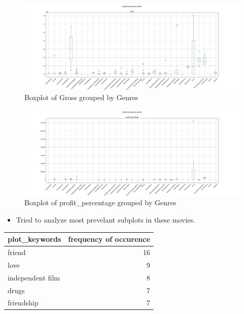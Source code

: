 \documentclass{beamer}
\begin{document}
\begin{frame}
\begin{figure}
	\includegraphics[width=\textwidth,height=\textheight,keepaspectratio]{test100.jpg}
	\caption{Boxplot of Gross grouped by Genres} 
  \label{fig:boat1}
\end{figure}

\end{frame}
\begin{frame}
\begin{figure}
	\includegraphics[width=\textwidth,height=\textheight,keepaspectratio]{test200.jpg}
	\caption{Boxplot of profit\_percentage grouped by Genres} 
  \label{fig:boat1}
\end{figure}

\end{frame}
\begin{frame}
\begin{itemize}
\item Tried to analyze most prevelant subplots in these movies.\\
\end{itemize}

\vspace{10mm} %
\centering
\begin{tabular}{lr}
\toprule
    plot\_keywords &  frequency of occurence \\
\midrule
           friend &                      16 \\
             love &                       9 \\
 independent film &                       8 \\
            drugs &                       7 \\
       friendship &                       7 \\
\bottomrule
\end{tabular}

\end{frame}
\end{document}
